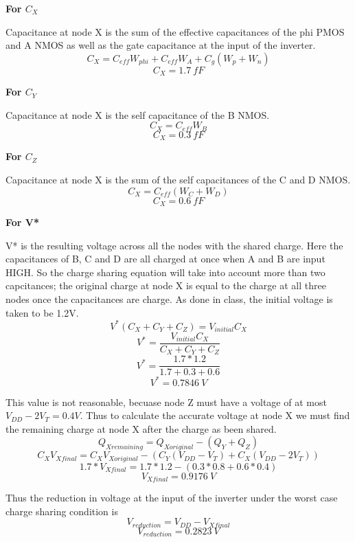 \documentclass[12pt]{article}
\begin{document}
\textbf{For $C_X$}

Capacitance at node X is the sum of the effective capacitances of the phi PMOS and A NMOS as well as the gate capacitance at the input of the inverter.
\[C_X = C_{eff}W_{phi} + C_{eff}W_A + C_g(W_p + W_n)\]
\[C_X = \SI{1.7}{fF} \]

\textbf{For $C_Y$}

Capacitance at node X is the self capacitance of the B NMOS.
\[C_X = C_{eff}W_{B}\]
\[C_X = \SI{0.3}{fF} \]

\textbf{For $C_Z$}

Capacitance at node X is the sum of the self capacitances of the C and D NMOS.
\[C_X = C_{eff}(W_C + W_D)\]
\[C_X = \SI{0.6}{fF} \]

\textbf{For V*}

V* is the resulting voltage across all the nodes with the shared charge. Here the capacitances of B, C and D are all charged at once when A and B are input HIGH. So the charge sharing equation will take into account more than two capcitances; the original charge at node X is equal to the charge at all three nodes once the capacitances are charge. As done in class, the initial voltage is taken to be 1.2V.
\[ V^*(C_X + C_Y + C_Z) = V_{initial}C_X \]
\[ V^* = \frac{V_{initial}C_X}{C_X + C_Y + C_Z}\]
\[ V^* = \frac{1.7*1.2}{1.7 + 0.3 + 0.6}\]
\[ V^* = \SI{0.7846}{V}\]

This value is not reasonable, becuase node Z must have a voltage of at most $V_{DD} - 2V_T = 0.4V$. Thus to calculate the accurate voltage at node X we must find the remaining charge at node X after the charge as been shared.
\[Q_{X remaining} = Q_{X original} - (Q_Y + Q_Z) \]
\[C_XV_{X final} = C_XV_{X original} - (C_Y(V_{DD} - V_T) + C_X(V_{DD} - 2V_T)) \]
\[1.7 * V_{X final} = 1.7*1.2 - (0.3*0.8 + 0.6*0.4)\]
\[V_{X final} = \SI{0.9176}{V}\]

Thus the reduction in voltage at the input of the inverter under the worst case charge sharing condition is 
\[V_{reduction} = V_{DD} - V_{X final} \]
\[V_{reduction} = \SI{0.2823}{V}\]

\pagebreak
\end{document}
